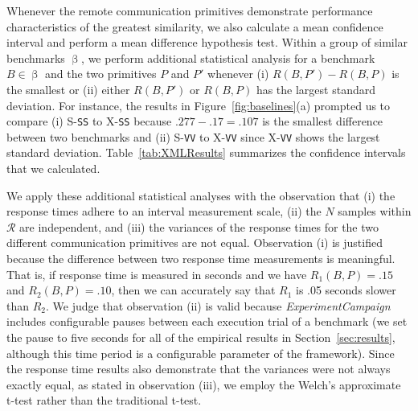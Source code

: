 \documentclass{sig-alternate}
\begin{document}
Whenever the remote communication primitives demonstrate performance
characteristics of the greatest similarity, we also calculate a mean
confidence interval and perform a mean difference hypothesis test.
Within a group of similar benchmarks $\upbeta$, we perform additional
statistical analysis for a benchmark $B \in \upbeta$ and the two
primitives $P$ and $P'$ whenever (i) $R(B,P') - R(B,P)$ is the
smallest or (ii) either $R(B,P')$ or $R(B,P)$ has the largest standard
deviation.  For instance, the results in Figure~\ref{fig:baselines}(a)
prompted us to compare (i) S-{\tt SS} to X-{\tt SS} because
$.277-.17=.107$ is the smallest difference between two benchmarks and
(ii) S-{\tt VV} to X-{\tt VV} since X-{\tt VV} shows the largest
standard deviation.  Table~\ref{tab:XMLResults} summarizes the
confidence intervals that we calculated.



We apply these additional statistical analyses with the observation
that (i) the response times adhere to an interval measurement scale,
(ii) the $N$ samples within $\mathcal{R}$ are independent, and (iii)
the variances of the response times for the two different
communication primitives are not equal.  Observation (i) is justified
because the difference between two response time measurements is
meaningful. That is, if response time is measured in seconds and we
have $R_1(B,P) = .15$ and $R_2(B,P) = .10$, then we can accurately say
that $R_1$ is .05 seconds slower than $R_2$.  We judge that
observation (ii) is valid because {\em ExperimentCampaign} includes
configurable pauses between each execution trial of a benchmark (we
set the pause to five seconds for all of the empirical results in
Section~\ref{sec:results}, although this time period is a configurable
parameter of the framework).  Since the response time results also
demonstrate that the variances were not always exactly equal, as
stated in observation (iii), we employ the Welch's approximate t-test
rather than the traditional t-test.



\end{document}
